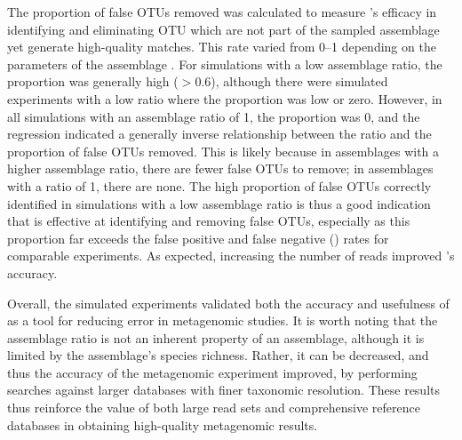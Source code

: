 The proportion of false \acp{OTU} removed was calculated to measure 's efficacy in identifying and eliminating \ac{OTU} which are not part of the sampled assemblage yet generate high-quality  matches.
This rate varied from 0--1 depending on the parameters of the assemblage .
For simulations with a low assemblage ratio, the proportion was generally high ($> 0.6$), although there were simulated experiments with a low ratio where the proportion was low or zero.
However, in all simulations with an assemblage ratio of 1, the proportion was 0, and the regression indicated a generally inverse relationship between the ratio and the proportion of false \acp{OTU} removed.
This is likely because in assemblages with a higher assemblage ratio, there are fewer false \acp{OTU} to remove; in assemblages with a ratio of 1, there are none.
The high proportion of false \acp{OTU} correctly identified in simulations with a low assemblage ratio is thus a good indication that  is effective at identifying and removing false \acp{OTU}, especially as this proportion far exceeds the false positive and false negative () rates for comparable experiments.
As expected, increasing the number of reads improved 's accuracy.

Overall, the simulated experiments validated both the accuracy and usefulness of  as a tool for reducing error in metagenomic studies.
It is worth noting that the assemblage ratio is not an inherent property of an assemblage, although it is limited by the assemblage's species richness.
Rather, it can be decreased, and thus the accuracy of the metagenomic experiment improved, by performing  searches against larger databases with finer taxonomic resolution.
These results thus reinforce the value of both large read sets and comprehensive reference databases in obtaining high-quality metagenomic results.
